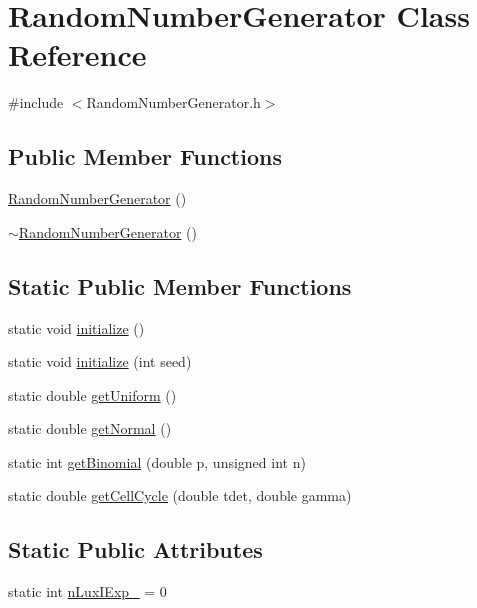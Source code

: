 \hypertarget{class_random_number_generator}{\section{\-Random\-Number\-Generator \-Class \-Reference}
\label{class_random_number_generator}
}


{\ttfamily \#include $<$\-Random\-Number\-Generator.\-h$>$}

\subsection*{\-Public \-Member \-Functions}
\begin{DoxyCompactItemize}
\item 
\hyperlink{class_random_number_generator_a8e7e711ea58f13f3ed95becbe33684e9}{\-Random\-Number\-Generator} ()
\item 
\hyperlink{class_random_number_generator_af4949b4234bd8d8283028162f8a8e7f5}{$\sim$\-Random\-Number\-Generator} ()
\end{DoxyCompactItemize}
\subsection*{\-Static \-Public \-Member \-Functions}
\begin{DoxyCompactItemize}
\item 
static void \hyperlink{class_random_number_generator_a7f9ac1a577f5f72fd07b5e769f232fbe}{initialize} ()
\item 
static void \hyperlink{class_random_number_generator_a16d763e85961dddeeebee1be0fc8a3a2}{initialize} (int seed)
\item 
static double \hyperlink{class_random_number_generator_a4f452a69c4f0fd0044979e3eea6ef358}{get\-Uniform} ()
\item 
static double \hyperlink{class_random_number_generator_adc771ab86d212e8d42fe4108d8a1a350}{get\-Normal} ()
\item 
static int \hyperlink{class_random_number_generator_afbb6020f2d5d13d08ce12256370d6408}{get\-Binomial} (double p, unsigned int n)
\item 
static double \hyperlink{class_random_number_generator_a4a8e5b43607e3d3d406bdc4f07ca3567}{get\-Cell\-Cycle} (double tdet, double gamma)
\end{DoxyCompactItemize}
\subsection*{\-Static \-Public \-Attributes}
\begin{DoxyCompactItemize}
\item 
static int \hyperlink{class_random_number_generator_a7a5c2be0f01f6265dee7285bc511f956}{n\-Lux\-I\-Exp\-\_\-} = 0
\end{DoxyCompactItemize}


